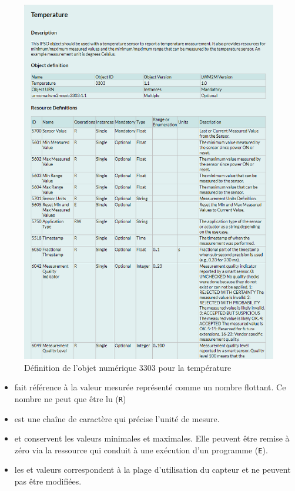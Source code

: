 \begin{figure}[tbp]
\centerline{\includegraphics[width=1\columnwidth]{Pictures/lwm2m-3303.png}}
\caption{Définition de l'objet numérique 3303 pour la température}
\label{fig-lwm2m-3303}
\end{figure}

\begin{itemize}
    \item \textit{} fait référence à la valeur mesurée représenté comme un nombre flottant. Ce nombre ne peut que être lu (\texttt{R})
    \item \textit{} est une chaîne de caractère qui précise l'unité de mesure.
    \item \textit{} et \textit{} conservent les valeurs minimales et maximales. Elle peuvent être remise à zéro via la ressource \textit{} qui conduit à une exécution d'un programme (\texttt{E}).
    \item les \textit{} et \textit{} valeurs correspondent à la plage d'utilisation du capteur et ne peuvent pas être modifiées.
\end{itemize}


